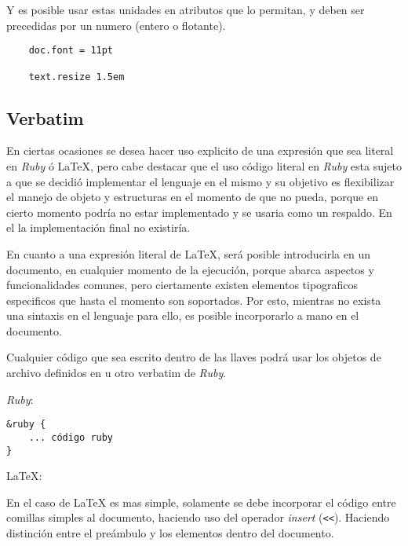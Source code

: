 \documentclass[12pt,letterpaper,titlepage,oneside,openright]{book}
\newcommand{\OhTeX}{%
    \makebox[0.76em][c]{O}%
    \makebox[0.25em][c]{%
        \raisebox{0.14em}[0em][0em]{%
            \fontsize{0.5em}{0cm}%
                \selectfont H%
        }%
    }%
    \makebox[1.35em][c]{\TeX}%
}
\newcommand{\latex}{\LaTeX\xspace}
\newcommand{\ohtex}{\OhTeX\xspace}
\newcommand{\ruby}{\textit{Ruby}\xspace}
\begin{document}
Y es posible usar estas unidades en atributos que lo permitan, y deben ser precedidas por un numero (entero o flotante).

\begin{center}
\begin{minipage}{\linewidth}
\begin{lstlisting}
    doc.font = 11pt
    
    text.resize 1.5em
\end{lstlisting}
\end{minipage}
\end{center}

\subsection{Verbatim}

En ciertas ocasiones se desea hacer uso explicito de una expresión que sea literal en \ruby ó \latex, pero cabe destacar que el uso código literal en \ruby esta sujeto a que se decidió implementar el lenguaje en el mismo y su objetivo es flexibilizar el manejo de objeto y estructuras en el momento de que \ohtex no pueda, porque en cierto momento podría no estar implementado y se usaria como un respaldo. En el la implementación final no existiría.

En cuanto a una expresión literal de \latex, será posible introducirla en un documento, en cualquier momento de la ejecución, porque \ohtex abarca aspectos y funcionalidades comunes, pero ciertamente existen elementos tipograficos especificos que hasta el momento son soportados. Por esto, mientras no exista una sintaxis en el lenguaje para ello, es posible incorporarlo a mano en el documento.

Cualquier código que sea escrito dentro de las llaves podrá usar los objetos de
archivo definidos en \ohtex u otro verbatim de \ruby.

\ruby:

\begin{center}
\begin{minipage}{\linewidth}
\begin{lstlisting}
&ruby {
    ... código ruby
}
\end{lstlisting}
\end{minipage}
\end{center}

\LaTeX:

En el caso de \latex es mas simple, solamente se debe incorporar el código entre
comillas simples al documento, haciendo uso del operador \textit{insert} (\verb$<<$). Haciendo
distinción entre el preámbulo y los elementos dentro del documento.
\end{document}
